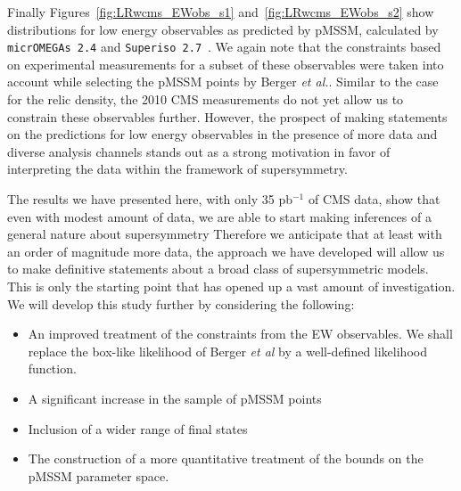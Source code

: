 Finally Figures~\ref{fig:LRwcms_EWobs_s1} and~\ref{fig:LRwcms_EWobs_s2} show distributions for low energy observables as predicted by pMSSM, calculated by {\tt micrOMEGAs 2.4} and {\tt Superiso 2.7}~\cite{Mahmoudi:2008tp}.  We again note that the constraints based on experimental measurements for a subset of these observables were taken into account while selecting the pMSSM points by Berger {\it et al.}.  Similar to the case for the relic density, the 2010 CMS measurements do not yet allow us to constrain these observables further.  However, the prospect of making statements on the predictions for low energy observables in the presence of more data and diverse analysis channels stands out as a strong motivation in favor of interpreting the data within the framework of supersymmetry.

The results we have presented here, with only 35 pb$^{-1}$ of CMS data, show that even with modest amount of data, we are able to start making inferences of a general nature about supersymmetry 
Therefore we anticipate that at least with an order of magnitude more data, the approach we have developed will allow us to make definitive statements about a broad class of supersymmetric models.  
This is only the starting point that has opened up a vast amount of investigation.  We will develop this study further by considering the following:

\begin{itemize}
\item An improved treatment of the constraints from the EW observables.  We shall replace the box-like likelihood of Berger {\it et al} by a well-defined likelihood function.
\item A significant increase in the sample of pMSSM points 
\item Inclusion of a wider range of final states
\item The construction of a more quantitative treatment of the bounds on the pMSSM parameter space.
\end{itemize}


